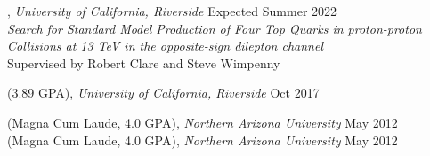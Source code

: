 , \textit{University of California, Riverside} \hfill Expected Summer 2022\\
\textit{Search for Standard Model Production of Four Top Quarks in proton-proton Collisions at 13 TeV in the opposite-sign dilepton channel}\\
Supervised by Robert Clare and Steve Wimpenny

 (3.89 GPA), \textit{University of California, Riverside}	\hfill Oct 2017

 (Magna Cum Laude, 4.0 GPA), \textit{Northern Arizona University} \hfill	May 2012\\
 (Magna Cum Laude, 4.0 GPA), \textit{Northern Arizona University} \hfill	May 2012\\



